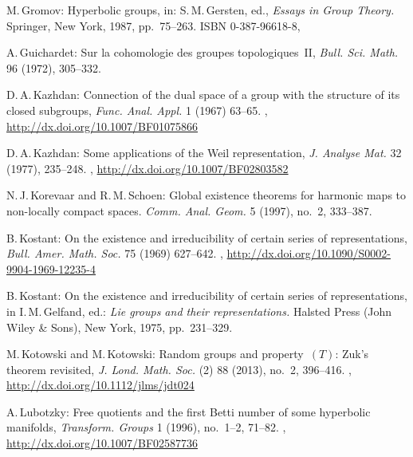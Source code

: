 \begin{references}{99}
M.\,Gromov:
 Hyperbolic groups, in:
S.\,M.\,Gersten, ed., \emph{Essays in Group Theory.}
 Springer, New York, 1987,
pp.~75--263.
 ISBN 0-387-96618-8,

A.\,Guichardet:
Sur la cohomologie des groupes topologiques~II,
\emph{Bull. Sci. Math.} 96 (1972), 305--332.

 D.\,A.\,Kazhdan:
Connection of the dual space of a group with the
structure of its closed subgroups, 
 \emph{Func. Anal. Appl.} 1 (1967) 63--65.
 ,
 \maynewline
 \url{http://dx.doi.org/10.1007/BF01075866}

 D.\,A.\,Kazhdan:
Some applications of the Weil representation,
\emph{J. Analyse Mat.} 32 (1977), 235--248. 
,
\maynewline
\url{http://dx.doi.org/10.1007/BF02803582}

N.\,J.\,Korevaar and R.\,M.\,Schoen:
Global existence theorems for harmonic maps to non-locally compact spaces. 
\emph{Comm. Anal. Geom.} 5 (1997), no.~2, 333--387.

B.\,Kostant:
On the existence and irreducibility of certain series of representations,
\emph{Bull. Amer. Math. Soc.} 75 (1969) 627--642.
,
\maynewline
\url{http://dx.doi.org/10.1090/S0002-9904-1969-12235-4}

B.\,Kostant:
On the existence and irreducibility of certain series of representations, 
in I.\,M.\,Gelfand, ed.:
\emph{Lie groups and their representations.}
 Halsted Press (John Wiley \& Sons), New York, 1975, pp.~231--329.

M.\,Kotowski and M.\,Kotowski:
Random groups and property~$(T)$: Zuk's theorem revisited,
\emph{J. Lond. Math. Soc.} (2) 88 (2013), no.~2, 396--416.
,
\maynewline
\url{http://dx.doi.org/10.1112/jlms/jdt024}


A.\,Lubotzky:
Free quotients and the first Betti number of some hyperbolic manifolds,
\emph{Transform. Groups} 1 (1996), no.~1--2, 71--82. 
,
\maynewline
\url{http://dx.doi.org/10.1007/BF02587736}


\end{references}
